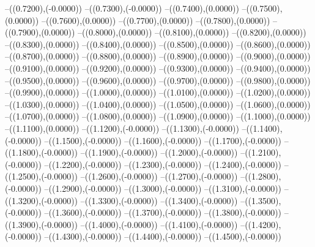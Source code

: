{	--({\sx*(0.7200)},{\sy*(-0.0000)})
	--({\sx*(0.7300)},{\sy*(-0.0000)})
	--({\sx*(0.7400)},{\sy*(0.0000)})
	--({\sx*(0.7500)},{\sy*(0.0000)})
	--({\sx*(0.7600)},{\sy*(0.0000)})
	--({\sx*(0.7700)},{\sy*(0.0000)})
	--({\sx*(0.7800)},{\sy*(0.0000)})
	--({\sx*(0.7900)},{\sy*(0.0000)})
	--({\sx*(0.8000)},{\sy*(0.0000)})
	--({\sx*(0.8100)},{\sy*(0.0000)})
	--({\sx*(0.8200)},{\sy*(0.0000)})
	--({\sx*(0.8300)},{\sy*(0.0000)})
	--({\sx*(0.8400)},{\sy*(0.0000)})
	--({\sx*(0.8500)},{\sy*(0.0000)})
	--({\sx*(0.8600)},{\sy*(0.0000)})
	--({\sx*(0.8700)},{\sy*(0.0000)})
	--({\sx*(0.8800)},{\sy*(0.0000)})
	--({\sx*(0.8900)},{\sy*(0.0000)})
	--({\sx*(0.9000)},{\sy*(0.0000)})
	--({\sx*(0.9100)},{\sy*(0.0000)})
	--({\sx*(0.9200)},{\sy*(0.0000)})
	--({\sx*(0.9300)},{\sy*(0.0000)})
	--({\sx*(0.9400)},{\sy*(0.0000)})
	--({\sx*(0.9500)},{\sy*(0.0000)})
	--({\sx*(0.9600)},{\sy*(0.0000)})
	--({\sx*(0.9700)},{\sy*(0.0000)})
	--({\sx*(0.9800)},{\sy*(0.0000)})
	--({\sx*(0.9900)},{\sy*(0.0000)})
	--({\sx*(1.0000)},{\sy*(0.0000)})
	--({\sx*(1.0100)},{\sy*(0.0000)})
	--({\sx*(1.0200)},{\sy*(0.0000)})
	--({\sx*(1.0300)},{\sy*(0.0000)})
	--({\sx*(1.0400)},{\sy*(0.0000)})
	--({\sx*(1.0500)},{\sy*(0.0000)})
	--({\sx*(1.0600)},{\sy*(0.0000)})
	--({\sx*(1.0700)},{\sy*(0.0000)})
	--({\sx*(1.0800)},{\sy*(0.0000)})
	--({\sx*(1.0900)},{\sy*(0.0000)})
	--({\sx*(1.1000)},{\sy*(0.0000)})
	--({\sx*(1.1100)},{\sy*(0.0000)})
	--({\sx*(1.1200)},{\sy*(-0.0000)})
	--({\sx*(1.1300)},{\sy*(-0.0000)})
	--({\sx*(1.1400)},{\sy*(-0.0000)})
	--({\sx*(1.1500)},{\sy*(-0.0000)})
	--({\sx*(1.1600)},{\sy*(-0.0000)})
	--({\sx*(1.1700)},{\sy*(-0.0000)})
	--({\sx*(1.1800)},{\sy*(-0.0000)})
	--({\sx*(1.1900)},{\sy*(-0.0000)})
	--({\sx*(1.2000)},{\sy*(-0.0000)})
	--({\sx*(1.2100)},{\sy*(-0.0000)})
	--({\sx*(1.2200)},{\sy*(-0.0000)})
	--({\sx*(1.2300)},{\sy*(-0.0000)})
	--({\sx*(1.2400)},{\sy*(-0.0000)})
	--({\sx*(1.2500)},{\sy*(-0.0000)})
	--({\sx*(1.2600)},{\sy*(-0.0000)})
	--({\sx*(1.2700)},{\sy*(-0.0000)})
	--({\sx*(1.2800)},{\sy*(-0.0000)})
	--({\sx*(1.2900)},{\sy*(-0.0000)})
	--({\sx*(1.3000)},{\sy*(-0.0000)})
	--({\sx*(1.3100)},{\sy*(-0.0000)})
	--({\sx*(1.3200)},{\sy*(-0.0000)})
	--({\sx*(1.3300)},{\sy*(-0.0000)})
	--({\sx*(1.3400)},{\sy*(-0.0000)})
	--({\sx*(1.3500)},{\sy*(-0.0000)})
	--({\sx*(1.3600)},{\sy*(-0.0000)})
	--({\sx*(1.3700)},{\sy*(-0.0000)})
	--({\sx*(1.3800)},{\sy*(-0.0000)})
	--({\sx*(1.3900)},{\sy*(-0.0000)})
	--({\sx*(1.4000)},{\sy*(-0.0000)})
	--({\sx*(1.4100)},{\sy*(-0.0000)})
	--({\sx*(1.4200)},{\sy*(-0.0000)})
	--({\sx*(1.4300)},{\sy*(-0.0000)})
	--({\sx*(1.4400)},{\sy*(-0.0000)})
	--({\sx*(1.4500)},{\sy*(-0.0000)})
}
